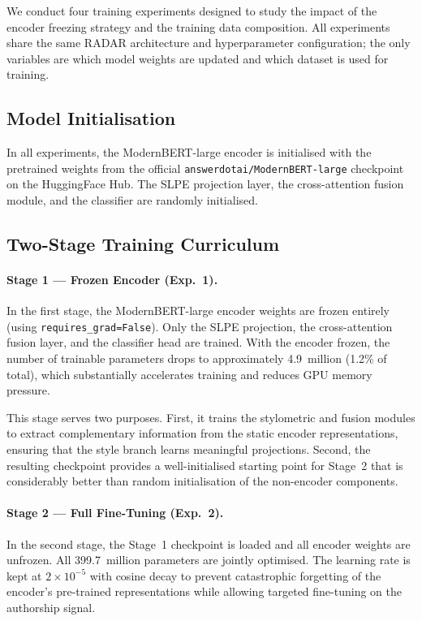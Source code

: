 We conduct four training experiments designed to study the impact of the encoder
freezing strategy and the training data composition. All experiments share the
same RADAR architecture and hyperparameter configuration; the only variables are
which model weights are updated and which dataset is used for training.

\subsection{Model Initialisation}

In all experiments, the ModernBERT-large encoder is initialised with the pretrained
weights from the official \texttt{answerdotai/ModernBERT-large} checkpoint on the
HuggingFace Hub. The SLPE projection layer, the cross-attention fusion module, and
the classifier are randomly initialised.

\subsection{Two-Stage Training Curriculum}

\paragraph{Stage 1 — Frozen Encoder (Exp.~1).}
In the first stage, the ModernBERT-large encoder weights are frozen entirely
(using \texttt{requires\_grad=False}). Only the SLPE projection, the cross-attention
fusion layer, and the classifier head are trained. With the encoder frozen, the
number of trainable parameters drops to approximately 4.9~million (1.2\% of total),
which substantially accelerates training and reduces GPU memory pressure.

This stage serves two purposes. First, it trains the stylometric and fusion modules
to extract complementary information from the static encoder representations, ensuring
that the style branch learns meaningful projections. Second, the resulting checkpoint
provides a well-initialised starting point for Stage~2 that is considerably better
than random initialisation of the non-encoder components.

\paragraph{Stage 2 — Full Fine-Tuning (Exp.~2).}
In the second stage, the Stage~1 checkpoint is loaded and all encoder weights are
unfrozen. All 399.7~million parameters are jointly optimised. The learning rate is kept
at $2 \times 10^{-5}$ with cosine decay to prevent catastrophic forgetting of the
encoder's pre-trained representations while allowing targeted fine-tuning on the
authorship signal.

